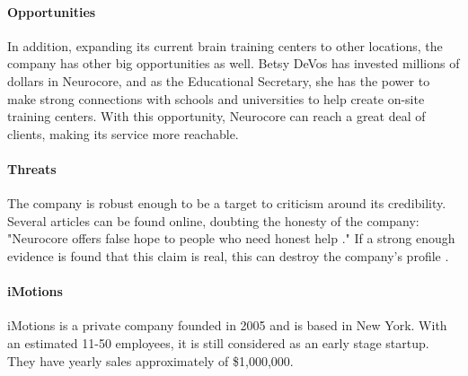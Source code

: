 \documentclass[letterpaper,10pt]{article}
\begin{document}
\cite{boser_2017}


\paragraph{Opportunities}

In addition, expanding its current brain training centers to other locations, the company has other big opportunities as well.
Betsy DeVos has invested millions of dollars in Neurocore, and as the Educational Secretary, she has the power to make strong connections with schools and universities to help create on-site training centers. With this opportunity, Neurocore can reach a great deal of clients, making its service more reachable.


\paragraph{Threats}

The company is robust enough to be a target to criticism around its credibility. Several articles can be found online, doubting the honesty of the company: "Neurocore offers false hope to people who need honest help ."
If a strong enough evidence is found that this claim is real, this can destroy the company's profile .


\cite{boser_2017}


\paragraph{iMotions}

iMotions is a private company founded in 2005 and is based in New York. With an estimated 11-50 employees, it is still considered as an early stage startup. They have yearly sales approximately of \$1,000,000. \cite{mergent_intellect}
\end{document}
